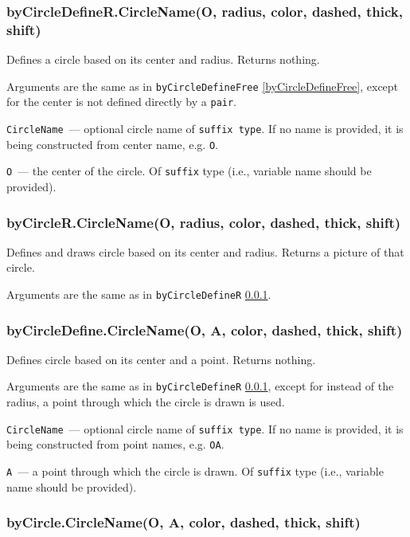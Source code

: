 \subsubsection{byCircleDefineR.CircleName(O, radius, color, dashed, thick, shift)}\label{byCircleDefineR}
	
	Defines a circle based on its center and radius. Returns nothing.
	
	Arguments are the same as in \texttt{byCircleDefineFree} \ref{byCircleDefineFree}, except for the center is not defined directly by a \texttt{pair}.
	
	\texttt{CircleName}~— optional circle name of \texttt{suffix type}. If no name is provided, it is being constructed from center name, e.g. \texttt{O}.
	
	\texttt{O}~— the center of the circle. Of \texttt{suffix} type (i.e., variable name should be provided).

\subsubsection{byCircleR.CircleName(O, radius, color, dashed, thick, shift)}\label{byCircleR}
	
	Defines and draws circle based on its center and radius. Returns a picture of that circle.
	
	Arguments are the same as in \texttt{byCircleDefineR} \ref{byCircleDefineR}.

\subsubsection{byCircleDefine.CircleName(O, A, color, dashed, thick, shift)}\label{byCircleDefine}
	
	Defines circle based on its center and a point. Returns nothing.
	
	Arguments are the same as in \texttt{byCircleDefineR} \ref{byCircleDefineR}, except for instead of the radius, a point through which the circle is drawn is used.
	
	\texttt{CircleName}~— optional circle name of \texttt{suffix type}. If no name is provided, it is being constructed from point names, e.g. \texttt{OA}.
	
	\texttt{A}~— a point through which the circle is drawn. Of \texttt{suffix} type (i.e., variable name should be provided).

\subsubsection{byCircle.CircleName(O, A, color, dashed, thick, shift)}\label{byCircle}
	

